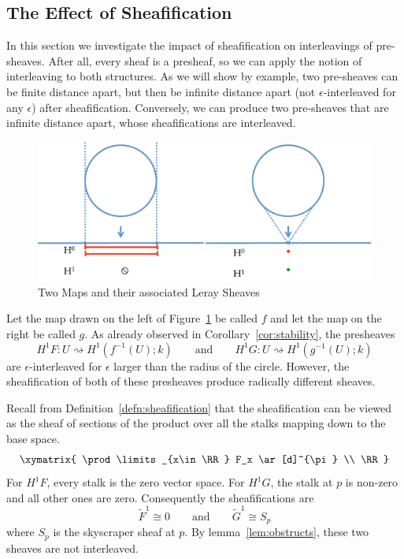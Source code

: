 \subsection{The Effect of Sheafification}

In this section we investigate the impact of sheafification on interleavings of pre-sheaves. After all, every sheaf is a presheaf, so we can apply the notion of interleaving to both structures. As we will show by example, two pre-sheaves can be finite distance apart, but then be infinite distance apart (not $\epsilon$-interleaved for any $\epsilon$) after sheafification. Conversely, we can produce two pre-sheaves that are infinite distance apart, whose sheafifications are interleaved.

\begin{figure}
\centering
\includegraphics[width=\textwidth]{interleaving_12.pdf}
\caption{Two Maps and their associated Leray Sheaves}
\label{fig:interleaving12}
\end{figure}

Let the map drawn on the left of Figure~\ref{fig:interleaving12} be called $f$ and let the map on the right be called $g$. As already observed in Corollary~\ref{cor:stability}, the presheaves 
\[
H^1F:U\rightsquigarrow H^1(f^{-1}(U);k) \qquad \mathrm{and} \qquad H^1G:U\rightsquigarrow H^1(g^{-1}(U);k)
\]
are $\epsilon$-interleaved for $\epsilon$ larger than the radius of the circle. However, the sheafification of both of these presheaves produce radically different sheaves. 

Recall from Definition~\ref{defn:sheafification} that the sheafification can be viewed as the sheaf of sections of the product over all the stalks mapping down to the base space.
\[
		\xymatrix{ \prod\limits_{x\in \RR} F_x \ar[d]^{\pi} \\ \RR}
\]
For $H^1F$, every stalk is the zero vector space. For $H^1G$, the stalk at $p$ is non-zero and all other ones are zero. Consequently the sheafifications are
\[
		\widetilde{F}^1 \cong 0 \qquad \mathrm{and} \qquad \widetilde{G}^1\cong S_p
\]
where $S_p$ is the skyscraper sheaf at $p$. By lemma~\ref{lem:obstructs}, these two sheaves are not interleaved.

